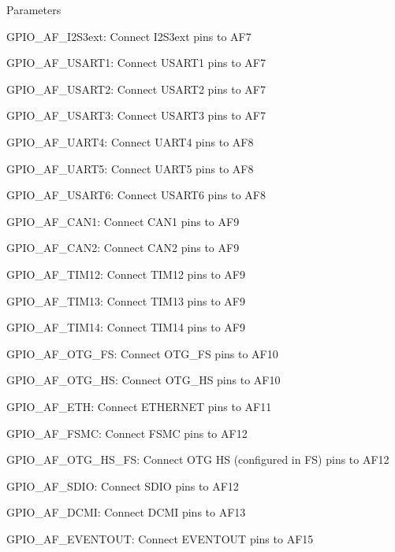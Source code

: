 \begin{DoxyParams}{Parameters}
\begin{DoxyItemize}
\item G\+P\+I\+O\+\_\+\+A\+F\+\_\+\+I2\+S3ext\+: Connect I2\+S3ext pins to A\+F7 \item G\+P\+I\+O\+\_\+\+A\+F\+\_\+\+U\+S\+A\+R\+T1\+: Connect U\+S\+A\+R\+T1 pins to A\+F7 \item G\+P\+I\+O\+\_\+\+A\+F\+\_\+\+U\+S\+A\+R\+T2\+: Connect U\+S\+A\+R\+T2 pins to A\+F7 \item G\+P\+I\+O\+\_\+\+A\+F\+\_\+\+U\+S\+A\+R\+T3\+: Connect U\+S\+A\+R\+T3 pins to A\+F7 \item G\+P\+I\+O\+\_\+\+A\+F\+\_\+\+U\+A\+R\+T4\+: Connect U\+A\+R\+T4 pins to A\+F8 \item G\+P\+I\+O\+\_\+\+A\+F\+\_\+\+U\+A\+R\+T5\+: Connect U\+A\+R\+T5 pins to A\+F8 \item G\+P\+I\+O\+\_\+\+A\+F\+\_\+\+U\+S\+A\+R\+T6\+: Connect U\+S\+A\+R\+T6 pins to A\+F8 \item G\+P\+I\+O\+\_\+\+A\+F\+\_\+\+C\+A\+N1\+: Connect C\+A\+N1 pins to A\+F9 \item G\+P\+I\+O\+\_\+\+A\+F\+\_\+\+C\+A\+N2\+: Connect C\+A\+N2 pins to A\+F9 \item G\+P\+I\+O\+\_\+\+A\+F\+\_\+\+T\+I\+M12\+: Connect T\+I\+M12 pins to A\+F9 \item G\+P\+I\+O\+\_\+\+A\+F\+\_\+\+T\+I\+M13\+: Connect T\+I\+M13 pins to A\+F9 \item G\+P\+I\+O\+\_\+\+A\+F\+\_\+\+T\+I\+M14\+: Connect T\+I\+M14 pins to A\+F9 \item G\+P\+I\+O\+\_\+\+A\+F\+\_\+\+O\+T\+G\+\_\+\+FS\+: Connect O\+T\+G\+\_\+\+FS pins to A\+F10 \item G\+P\+I\+O\+\_\+\+A\+F\+\_\+\+O\+T\+G\+\_\+\+HS\+: Connect O\+T\+G\+\_\+\+HS pins to A\+F10 \item G\+P\+I\+O\+\_\+\+A\+F\+\_\+\+E\+TH\+: Connect E\+T\+H\+E\+R\+N\+ET pins to A\+F11 \item G\+P\+I\+O\+\_\+\+A\+F\+\_\+\+F\+S\+MC\+: Connect F\+S\+MC pins to A\+F12 \item G\+P\+I\+O\+\_\+\+A\+F\+\_\+\+O\+T\+G\+\_\+\+H\+S\+\_\+\+FS\+: Connect O\+TG HS (configured in FS) pins to A\+F12 \item G\+P\+I\+O\+\_\+\+A\+F\+\_\+\+S\+D\+IO\+: Connect S\+D\+IO pins to A\+F12 \item G\+P\+I\+O\+\_\+\+A\+F\+\_\+\+D\+C\+MI\+: Connect D\+C\+MI pins to A\+F13 \item G\+P\+I\+O\+\_\+\+A\+F\+\_\+\+E\+V\+E\+N\+T\+O\+UT\+: Connect E\+V\+E\+N\+T\+O\+UT pins to A\+F15 \end{DoxyItemize}
\\
\hline
\end{DoxyParams}

